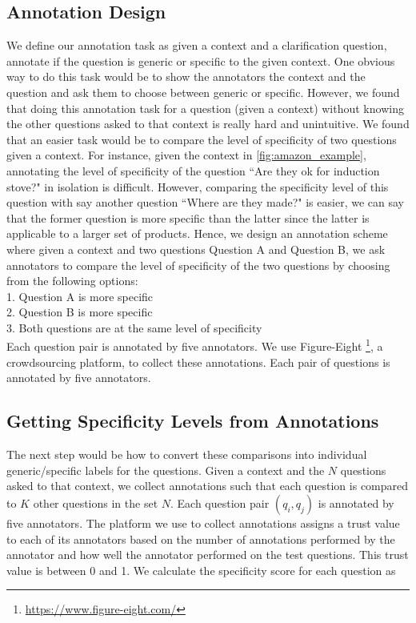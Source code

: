 \documentclass[11pt,a4paper]{article}
\begin{document}
\subsection{Annotation Design}

We define our annotation task as given a context and a clarification question, annotate if the question is generic or specific to the given context. One obvious way to do this task would be to show the annotators the context and the question and ask them to choose between generic or specific. However, we found that doing this annotation task for a question (given a context)  without knowing the other questions asked to that context is really hard and unintuitive. We found that an easier task would be to compare the level of specificity of two questions given a context. For instance, given the context in \autoref{fig:amazon_example}, annotating the level of specificity of the question  ``Are they ok for induction stove?" in isolation is difficult. However, comparing the specificity level of this question with say another question ``Where are they made?" is easier, we can say that the former question is more specific than the latter since the latter is applicable to a larger set of products.  Hence, we design an annotation scheme where given a context and two questions Question A and Question B, we ask annotators to compare the level of specificity of the two questions by choosing from the following options:\\
1. Question A is more specific \\
2. Question B is more specific \\
3. Both questions are at the same level of specificity\\
Each question pair is annotated by five annotators. 
We use Figure-Eight \footnote{\url{https://www.figure-eight.com/}}, a crowdsourcing platform, to collect these annotations. Each pair of questions is annotated by five annotators. 


\subsection{Getting Specificity Levels from Annotations}

The next step would be how to convert these comparisons into individual generic/specific labels for the questions. Given a context and the $N$ questions asked to that context, we collect annotations such that each question is compared to $K$ other questions in the set $N$. Each question pair $(q_i, q_j)$ is annotated by five annotators. The platform we use to collect annotations assigns a trust value to each of its annotators based on the number of annotations performed by the annotator and how well the annotator performed on the test questions. This trust value is between 0 and 1. We calculate the specificity score for each question as \\
\end{document}

